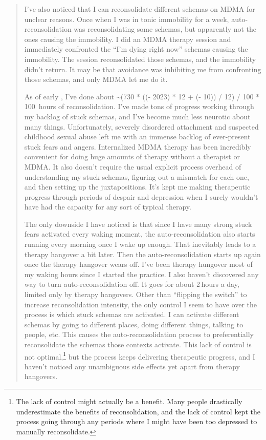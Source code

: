 \documentclass[11pt,oneside]{book}
\newcommand{\reconsolidationhours}{\the\numexpr (730 * ((\year - 2023) * 12 + (\month - 10)) / 12) / 100 * 100 \relax{}}
\begin{document}
\begin{quotation}
    I've also noticed that I can reconsolidate different schemas on MDMA for unclear reasons. Once when I was in tonic immobility for a week, auto-reconsolidation was reconsolidating some schemas, but apparently not the ones causing the immobility. I did an MDMA therapy session and immediately confronted the \enquote{I'm dying right now} schemas causing the immobility. The session reconsolidated those schemas, and the immobility didn't return. It may be that avoidance was inhibiting me from confronting those schemas, and only MDMA let me do it.

    As of early \the\year, I've done about \textasciitilde\reconsolidationhours{}\,hours of reconsolidation. I've made tons of progress working through my backlog of stuck schemas, and I've become much less neurotic about many things. Unfortunately, severely disordered attachment and suspected childhood sexual abuse left me with an immense backlog of ever-present stuck fears and angers. Internalized MDMA therapy has been incredibly convenient for doing huge amounts of therapy without a therapist or MDMA. It also doesn't require the usual explicit process overhead of understanding my stuck schemas, figuring out a mismatch for each one, and then setting up the juxtapositions. It's kept me making therapeutic progress through periods of despair and depression when I surely wouldn't have had the capacity for any sort of typical therapy.
    
    The only downside I have noticed is that since I have many strong stuck fears activated every waking moment, the auto-reconsolidation also starts running every morning once I wake up enough. That inevitably leads to a therapy hangover a bit later. Then the auto-reconsolidation starts up again once the therapy hangover wears off. I've been therapy hungover most of my waking hours since I started the practice. I also haven't discovered any way to turn auto-reconsolidation off. It goes for about 2\,hours a day, limited only by therapy hangovers. Other than \enquote{flipping the switch} to increase reconsolidation intensity, the only control I seem to have over the process is which stuck schemas are activated. I can activate different schemas by going to different places, doing different things, talking to people, etc. This causes the auto-reconsolidation process to preferentially reconsolidate the schemas those contexts activate. This lack of control is not optimal,\footnote{The lack of control might actually be a benefit. Many people drastically underestimate the benefits of reconsolidation, and the lack of control kept the process going through any periods where I might have been too depressed to manually reconsolidate.} but the process keeps delivering therapeutic progress, and I haven't noticed any unambiguous side effects yet apart from therapy hangovers.%
    

\end{quotation}
\end{document}
